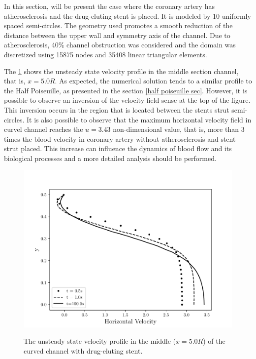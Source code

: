 In this section, will be present
the case where the coronary 
artery has atherosclerosis and 
the drug-eluting stent is placed. 
It is modeled by 10 uniformly spaced 
semi-circles. 
The geometry used promotes a smooth reduction of the 
distance between the upper wall and symmetry axis of the channel. 
Due to atherosclerosis, 40\% channel obstruction was considered 
and the domain was discretized using 15875 nodes and 35408 
linear triangular elements. 

\medskip 
The \ref{velocity evolution curved stent} shows the unsteady state 
velocity profile in the middle section channel, that is, 
$x=5.0R$. 
As expected, the numerical solution tends to a similar profile to
the Half Poiseuille, as presented in the section \ref{half poiseuille sec}. However, it is possible to observe an inversion of the velocity
field sense at the top of the figure.
This inversion occurs in the region that is
located between the stents strut semi-circles.
It is also possible to observe that the maximum horizontal velocity field 
in curvel channel reaches the $u=3.43$ non-dimensional value, that is, 
more than 3 times the blood velocity in coronary artery
without atherosclerosis and stent strut placed. 
This increase can influence the dynamics of blood flow
and its biological processes and a more detailed analysis
should be performed.

\begin{figure}[H]
     \centering
     \includegraphics[scale=1]{./02_chaps/cap_solution/figure/vel_CurvedStrut_evol.pdf}\\
     \caption{
The unsteady state velocity profile in the middle ($x=5.0R$) of the curved channel with drug-eluting stent.}
     \label{velocity evolution curved stent}
\end{figure}

